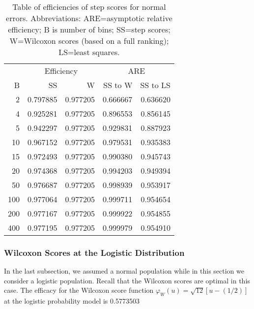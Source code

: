 \begin{table}[ht]
\centering
\begin{tabular}{r|rr|rr}
  \hline
 & \multicolumn{2}{c|}{Efficiency} & \multicolumn{2}{|c}{ARE} \\
 B & SS & W & SS to W & SS to LS \\ 
  \hline
 2 & 0.797885 & 0.977205 & 0.666667 & 0.636620 \\ 
 4 & 0.925281 & 0.977205 & 0.896553 & 0.856145 \\ 
 5 & 0.942297 & 0.977205 & 0.929831 & 0.887923 \\ 
 10 & 0.967152 & 0.977205 & 0.979531 & 0.935383 \\ 
 15 & 0.972493 & 0.977205 & 0.990380 & 0.945743 \\ 
 20 & 0.974368 & 0.977205 & 0.994203 & 0.949394 \\ 
 50 & 0.976687 & 0.977205 & 0.998939 & 0.953917 \\ 
 100 & 0.977064 & 0.977205 & 0.999711 & 0.954654 \\ 
 200 & 0.977167 & 0.977205 & 0.999922 & 0.954855 \\ 
 400 & 0.977195 & 0.977205 & 0.999979 & 0.954910 \\ 
   \hline
\end{tabular}
\caption{
Table of efficiencies of step scores for normal errors.
Abbreviations: ARE=asymptotic relative efficiency; B is number of bins; SS=step scores; W=Wilcoxon scores (based on a full ranking); LS=least squares.
}
\label{tabeff}
\end{table}
\subsubsection{Wilcoxon Scores at the Logistic Distribution}
In the last subsection, we assumed a normal population while in this section we consider a logistic
population.
Recall that the Wilcoxon scores are optimal in this case.
The efficacy for the Wilcoxon score function $\varphi_W(u) = \sqrt{12}[u-(1/2)]$ at the logistic
probability model is 0.5773503

